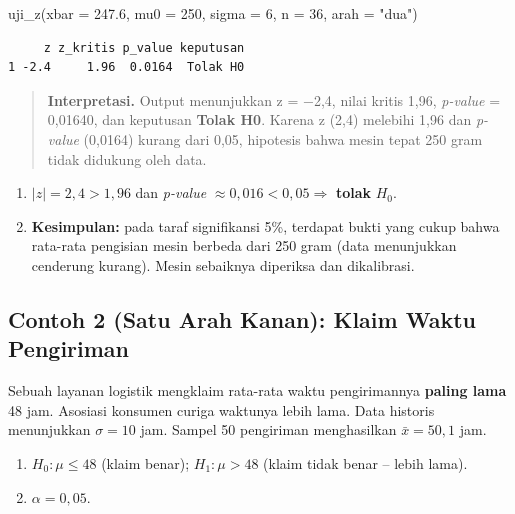 \documentclass[
  indonesian,
  letterpaper,
]{book}
\newenvironment{Shaded}{\begin{snugshade}}{\end{snugshade}}
\newcommand{\AttributeTok}[1]{\textcolor[rgb]{0.40,0.45,0.13}{#1}}
\newcommand{\DecValTok}[1]{\textcolor[rgb]{0.68,0.00,0.00}{#1}}
\newcommand{\FloatTok}[1]{\textcolor[rgb]{0.68,0.00,0.00}{#1}}
\newcommand{\FunctionTok}[1]{\textcolor[rgb]{0.28,0.35,0.67}{#1}}
\newcommand{\NormalTok}[1]{\textcolor[rgb]{0.00,0.23,0.31}{#1}}
\newcommand{\StringTok}[1]{\textcolor[rgb]{0.13,0.47,0.30}{#1}}
\providecommand{\tightlist}{%
  \setlength{\itemsep}{0pt}\setlength{\parskip}{0pt}}
\begin{document}
\begin{Shaded}
\begin{Highlighting}[]
\FunctionTok{uji\_z}\NormalTok{(}\AttributeTok{xbar =} \FloatTok{247.6}\NormalTok{, }\AttributeTok{mu0 =} \DecValTok{250}\NormalTok{, }\AttributeTok{sigma =} \DecValTok{6}\NormalTok{, }\AttributeTok{n =} \DecValTok{36}\NormalTok{, }\AttributeTok{arah =} \StringTok{"dua"}\NormalTok{)}
\end{Highlighting}
\end{Shaded}

\begin{verbatim}
     z z_kritis p_value keputusan
1 -2.4     1.96  0.0164  Tolak H0
\end{verbatim}

\begin{quote}
\textbf{Interpretasi.} Output menunjukkan z = −2,4, nilai kritis 1,96,
\emph{p-value} = 0,01640, dan keputusan \textbf{Tolak H0}. Karena
\textbar z\textbar{} (2,4) melebihi 1,96 dan \emph{p-value} (0,0164)
kurang dari 0,05, hipotesis bahwa mesin tepat 250 gram tidak didukung
oleh data.
\end{quote}

\begin{enumerate}
\def\labelenumi{\arabic{enumi}.}
\setcounter{enumi}{3}
\tightlist
\item
  \(\lvert z \rvert = 2{,}4 > 1{,}96\) dan \emph{p-value}
  \(\approx 0{,}016 < 0{,}05 \Rightarrow\) \textbf{tolak} \(H_0\).
\item
  \textbf{Kesimpulan:} pada taraf signifikansi 5\%, terdapat bukti yang
  cukup bahwa rata-rata pengisian mesin berbeda dari 250 gram (data
  menunjukkan cenderung kurang). Mesin sebaiknya diperiksa dan
  dikalibrasi.
\end{enumerate}

\subsection{Contoh 2 (Satu Arah Kanan): Klaim Waktu
Pengiriman}\label{contoh-2-satu-arah-kanan-klaim-waktu-pengiriman}

Sebuah layanan logistik mengklaim rata-rata waktu pengirimannya
\textbf{paling lama} 48 jam. Asosiasi konsumen curiga waktunya lebih
lama. Data historis menunjukkan \(\sigma = 10\) jam. Sampel 50
pengiriman menghasilkan \(\bar{x} = 50{,}1\) jam.

\begin{enumerate}
\def\labelenumi{\arabic{enumi}.}
\tightlist
\item
  \(H_0: \mu \le 48\) (klaim benar); \(H_1: \mu > 48\) (klaim tidak
  benar -- lebih lama).
\item
  \(\alpha = 0{,}05\).
\end{enumerate}
\end{document}
